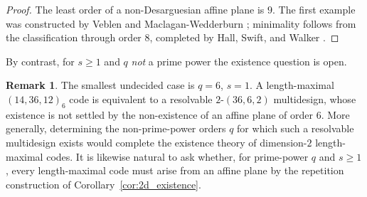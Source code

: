 \documentclass[12pt, letterpaper]{article}
\theoremstyle{plain}
\theoremstyle{definition}
\newtheorem{remark}[theorem]{Remark}
\newcommand{\F}{\mathbb{F}}
\newcommand{\mc}[1]{\mathcal{#1}}
\begin{document}
\begin{proof}
		
%
		
		
		The least order of a non-Desarguesian affine plane is $9$. The first example was constructed by Veblen and Maclagan-Wedderburn \cite{VeblenMaclaganWedderburn1907}; minimality follows from the classification through order 8, completed by Hall, Swift, and Walker \cite{HallSwiftWalker1956}.
	\end{proof}

	By contrast, for $s \ge 1$ and $q$ \emph{not} a prime power the existence question is open.

	\begin{remark}\label{rem:2d_open}
		The smallest undecided case is $q = 6$, $s = 1$. A length-maximal $(14, 36, 12)_6$ code is equivalent to a resolvable $2$-$(36, 6, 2)$ multidesign, whose existence is not settled by the non-existence of an affine plane of order $6$. More generally, determining the non-prime-power orders $q$ for which such a resolvable multidesign exists would complete the existence theory of dimension-$2$ length-maximal codes. It is likewise natural to ask whether, for prime-power $q$ and $s \ge 1$, every length-maximal code must arise from an affine plane by the repetition construction of Corollary~\ref{cor:2d_existence}.
	\end{remark}
\end{document}
